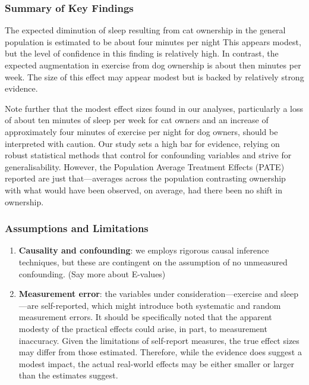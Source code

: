 \documentclass[
  singlecolumn,
  9pt]{article}
\begin{document}
\subsubsection{Summary of Key Findings}\label{summary-of-key-findings}

The expected diminution of sleep resulting from cat ownership in the
general population is estimated to be about four minutes per night This
appears modest, but the level of confidence in this finding is
relatively high. In contrast, the expected augmentation in exercise from
dog ownership is about then minutes per week. The size of this effect
may appear modest but is backed by relatively strong evidence.

Note further that the modest effect sizes found in our analyses,
particularly a loss of about ten minutes of sleep per week for cat
owners and an increase of approximately four minutes of exercise per
night for dog owners, should be interpreted with caution. Our study sets
a high bar for evidence, relying on robust statistical methods that
control for confounding variables and strive for generalisability.
However, the Population Average Treatment Effects (PATE) reported are
just that---averages across the population contrasting ownership with
what would have been observed, on average, had there been no shift in
ownership.

\subsubsection{Assumptions and
Limitations}\label{assumptions-and-limitations}

\begin{enumerate}
\def\labelenumi{\arabic{enumi}.}
\item
  \textbf{Causality and confounding}: we employs rigorous causal
  inference techniques, but these are contingent on the assumption of no
  unmeasured confounding. (Say more about E-values)
\item
  \textbf{Measurement error}: the variables under
  consideration---exercise and sleep---are self-reported, which might
  introduce both systematic and random measurement errors. It should be
  specifically noted that the apparent modesty of the practical effects
  could arise, in part, to measurement inaccuracy. Given the limitations
  of self-report measures, the true effect sizes may differ from those
  estimated. Therefore, while the evidence does suggest a modest impact,
  the actual real-world effects may be either smaller or larger than the
  estimates suggest.
\end{enumerate}
\end{document}
